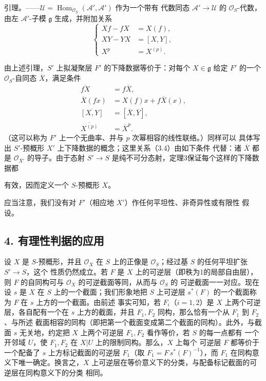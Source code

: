 \textsc{引理。}——$\mathcal U=
\operatorname{Hom}_{\mathcal O_S}(\mathcal A',\mathcal A')$ 作为一个带有
代数同态 $\mathcal A'\longrightarrow\mathcal U$ 的 $\mathcal O_S$-代数，
由左 $\mathcal A'$-子模 $\mathfrak g$ 生成，并附加关系
\begin{equation}
  \left\{
  \begin{aligned}
    Xf-fX&=X(f),\\
    XY-YX&=[X,Y],\\
    X^p&=X^{(p)}.
  \end{aligned}
  \right.
  \tag{3.6}
\end{equation}

由上述引理，$S'$ 上拟凝聚层 $F'$ 的下降数据等价于：对每个
$X\in\mathfrak g$ 给定 $F'$ 的一个 $\mathcal O_S$-自同态
$\overline X$，满足条件
\begin{align}
  \overline{fX}&=f\overline X, \tag{3.7}\\
  \overline X(fx)&=X(f)x+f\overline X(x), \tag{3.8}\\
  \overline{[X,Y]}&=[\overline X,\overline Y], \tag{3.9}\\
  \overline{X^{(p)}}&=\overline X^p. \tag{3.10}
\end{align}
（这可以称为 $F'$ 上一个无曲率、并与 $p$ 次幂相容的线性联络。）同样可以
具体写出 $S'$-预概形 $X'$ 上下降数据的概念；这里关系（3.4）由如下条件
代替：诸 $\overline X$ 都是 $\mathcal O_{X'}$ 的导子。由于态射
$S'\longrightarrow S$ 是纯不可分态射，定理3保证每个这样的下降数据都

有效，因而定义一个 $S$-预概形 $X$。

应当注意，我们没有对 $F'$（相应地 $X'$）作任何平坦性、非奇异性或有限性
假设。

\subsection*{4. 有理性判据的应用}

设 $X$ 是 $S$-预概形，并且 $\mathcal O_X$ 在 $S$ 上的正像是
$\mathcal O_S$；经过基 $S$ 的任何平坦扩张 $S'\longrightarrow S$，这个
性质仍然成立。若 $F$ 是 $X$ 上的可逆层（即秩为1的局部自由层），则 $F$
的自同构可与 $\mathcal O_X$ 的可逆截面等同，从而与 $\mathcal O_S$ 的
可逆截面一一对应。现在设 $s$ 是 $X$ 在 $S$ 上的一个截面；我们形象地把
$S$ 上可逆层 $s^*(F)$ 的一个截面称为 $F$ 在 $s$ 上方的一个截面。由前述
事实可知，若 $F_i$（$i=1,2$）是 $X$ 上两个可逆层，各自配有一个在 $s$
上方的截面，并且 $F_1,F_2$ 同构，那么恰有一个从 $F_1$ 到 $F_2$、与所述
截面相容的同构（即把第一个截面变成第二个截面的同构）。此外，与截面 $s$
无关地，约定把 $X$ 上两个可逆层 $F_1,F_2$ 看作等价，若 $S$ 的每一点都有
一个开邻域 $U$，使 $F_1,F_2$ 在 $X|U$ 上的限制同构。那么，$X$ 上每个
可逆层 $F$ 都等价于一个配备了 $s$ 上方标记截面的可逆层 $F_1$（取
$F_1=F\,s^*(F)^{-1}$），而 $F_1$ 在同构意义下唯一确定。换言之，$X$
上可逆层在等价意义下的分类，与配备标记截面的可逆层在同构意义下的分类
相同。

